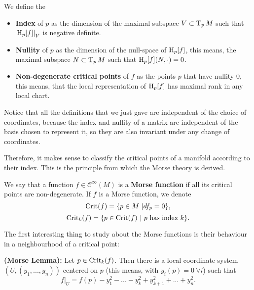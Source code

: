 \begin{deff}
	We define the

\begin{itemize}
	\item {\bf Index} of $p$ as the dimension of the maximal subspace $V \subset \operatorname T_pM$ such that $\left. \operatorname H_p[f] \right|_V$ is negative definite.
	\item {\bf Nullity} of $p$ as the dimension of the null-space of $\operatorname H_p[f]$, this means, the maximal subspace $N \subset \operatorname T_pM$ such that $\operatorname H_p[f](N,\cdot) = 0$.
	\item {\bf Non-degenerate critical points} of $f$ as the points $p$ that have nullity $0$, this means, that the local representation of $\operatorname H_p[f]$ has maximal rank in any local chart.
\end{itemize}
\end{deff}

Notice that all the definitions that we just gave are independent of the choice of coordinates, because the index and nullity of a matrix are independent of the basis chosen to represent it, so they are also invariant under any change of coordinates.

Therefore, it makes sense to classify the critical points of a manifold according to their index. This is the principle from which the Morse theory is derived.

\begin{deff}
	We say that a function $f \in \mathcal{C}^{\infty}(M)$ is a {\bf Morse function} if all its critical points are non-degenerate.
	If $f$ is a Morse function, we denote
	\[\mathrm{Crit}(f) = \{ p \in M \ | d f_p = 0 \} ,\]
	\[\mathrm{Crit}_k(f) = \{p \in \mathrm{Crit}(f) \ | \text{ $p$ has index $k$}\} .\]
\end{deff}

The first interesting thing to study about the Morse functions is their behaviour in a neighbourhood of a critical point:

\begin{prop} \label{morselemma}
	{\bf (Morse Lemma):} Let $p \in \mathrm{Crit}_k(f)$. Then there is a local coordinate system $(U,(y_1,...,y_n))$ centered on $p$ (this means, with $y_i(p) = 0 \ \forall i$) such that
	\[\left. f \right|_U = f(p) - y_1^2 - ... - y_k^2 + y_{k+1}^2 + ... + y_n^2 .\]
\end{prop}

